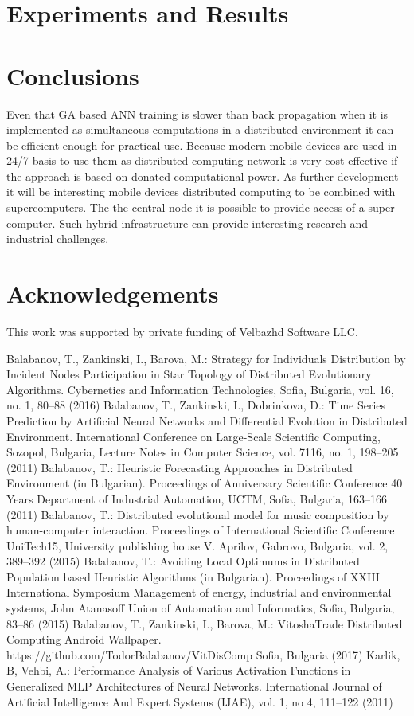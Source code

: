 \documentclass{llncs}
\begin{document}
\section{Experiments and Results}
%
%
\section{Conclusions}
%
Even that GA based ANN training is slower than back propagation when it is implemented as simultaneous computations in a distributed environment it can be efficient enough for practical use. Because modern mobile devices are used in 24/7 basis to use them as distributed computing network is very cost effective if the approach is based on donated computational power. As further development it will be interesting mobile devices distributed computing to be combined with supercomputers. The the central node it is possible to provide access of a super computer. Such hybrid infrastructure can provide interesting research and industrial challenges.
%
\section*{Acknowledgements}
%
This work was supported by private funding of Velbazhd Software LLC.
%
%
\begin{thebibliography}{}
%
Balabanov, T., Zankinski, I., Barova, M.:
Strategy for Individuals Distribution by Incident Nodes Participation in Star Topology of Distributed Evolutionary Algorithms.
Cybernetics and Information Technologies, Sofia, Bulgaria, vol. 16, no. 1, 80--88  (2016)
%
Balabanov, T., Zankinski, I., Dobrinkova, D.:
Time Series Prediction by Artificial Neural Networks and Differential Evolution in Distributed Environment.
International Conference on Large-Scale Scientific Computing, Sozopol, Bulgaria, Lecture Notes in Computer Science, vol. 7116, no. 1, 198--205  (2011)
%
Balabanov, T.:
Heuristic Forecasting Approaches in Distributed Environment (in Bulgarian).
Proceedings of Anniversary Scientific Conference 40 Years Department of Industrial Automation, UCTM, Sofia, Bulgaria, 163--166 (2011)
%
Balabanov, T.:
Distributed evolutional model for music composition by human-computer interaction.
Proceedings of International Scientific Conference UniTech15, University publishing house V. Aprilov, Gabrovo, Bulgaria, vol. 2, 389--392 (2015)
%
Balabanov, T.:
Avoiding Local Optimums in Distributed Population based Heuristic Algorithms (in Bulgarian).
Proceedings of XXIII International Symposium Management of energy, industrial and environmental systems, John Atanasoff Union of Automation and Informatics, Sofia, Bulgaria, 83--86 (2015)
%
Balabanov, T., Zankinski, I., Barova, M.:
VitoshaTrade Distributed Computing Android Wallpaper.
https://github.com/TodorBalabanov/VitDisComp Sofia, Bulgaria  (2017)
%
Karlik, B, Vehbi, A.:
Performance Analysis of Various Activation Functions in Generalized MLP Architectures of Neural Networks.
International Journal of Artificial Intelligence And Expert Systems (IJAE), vol. 1, no 4, 111--122 (2011) 
%
\end{thebibliography}
\end{document}

